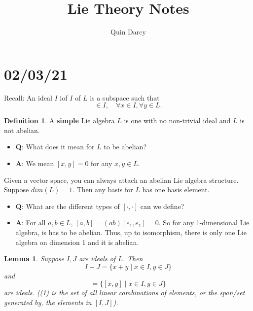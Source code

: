 \documentclass[12pt]{article}
\newtheorem{lemma}[theorem]{Lemma}
\theoremstyle{definition}
\newtheorem{definition}{Definition}[section]
\theoremstyle{definition}
\newcommand{\dm}[1]{ dim (#1) }
\begin{document}
\title{Lie Theory Notes}
\author{Quin Darcy}
\maketitle
    \section{02/03/21}
        Recall: An ideal $I$ iof $I$ of $L$ is a subspace such that 
            \begin{equation*}
                [x, y]\in I, \quad\forall x\in I, \forall y\in L.
            \end{equation*}
        \begin{definition}
            A \textbf{simple} Lie algebra $L$ is one with no non-trivial ideal
            and $L$ is not abelian. 
        \end{definition}
        \begin{itemize}
            \item \textbf{Q}: What does it mean for $L$ to be abelian?
            \item \textbf{A}: We mean $[x, y]=0$ for any $x, y\in L$.\par
        \end{itemize}
        \noindent Given a vector space, you can always attach an abelian Lie algebra
        structure. Suppose $\dm{L}=1$. Then any basis for $L$ has one
        basis element.
        \begin{itemize}
            \item \textbf{Q}: What are the different types of $[\cdot,\cdot]$ can we define?
            \item \textbf{A}: For all $a, b\in L$, $[a,
                b]=(ab)[e_1, e_1]=0$. So for any 1-dimensional Lie algebra, is has to
                be abelian. Thus, up to isomorphism, there is only one Lie algebra on
                dimension 1 and it is abelian. 
        \end{itemize}
        \begin{lemma}
            Suppose $I, J$ are ideals of $L$. Then 
                \begin{equation*}
                    I+J=\{x+y\mid x\in I, y\in J\}
                \end{equation*}
            and 
                \begin{equation}
                    [I, J]=\{[x, y]\mid x\in I, y\in J\}
                \end{equation}
                are ideals. ((1) is the set of all linear combinations of
                elements, or the span/set generated by, the elements in $[I,
            J]$).
        \end{lemma}\newpage
\end{document}
